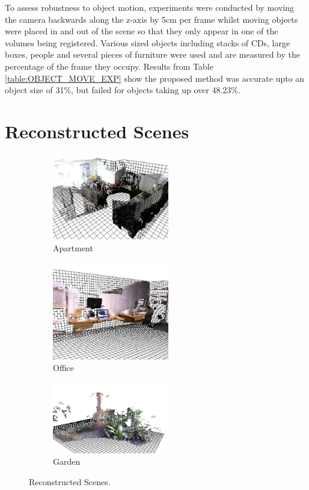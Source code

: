 To assess robustness to object motion, experiments were conducted by moving the camera backwards along the z-axis by 5cm per frame whilst moving objects were placed in and out of the scene so that they only appear in one of the volumes being registered. Various sized objects including stacks of CDs, large boxes, people and several pieces of furniture were used and are measured by the percentage of the frame they occupy. Results from Table \ref{table:OBJECT_MOVE_EXP} show the proposed method was accurate upto an object size of 31\%, but failed for objects taking up over 48.23\%.

\section{Reconstructed Scenes}
\label{Sec:FVRQual1Exp}

\begin{figure}[t] 
        \centering
        \begin{subfigure}[b]{2.0in}
                \includegraphics[width=2.0in]{images/ch2/unit21}
                \caption{Apartment}
                \label{fig:RECON_UNIT}
        \end{subfigure}%
        \begin{subfigure}[b]{2.0in}
                \includegraphics[width=2.0in]{images/ch2/officeA}
                \caption{Office}
                \label{fig:RECON_OFFICE}
        \end{subfigure}%
        \begin{subfigure}[b]{2.0in}
                \includegraphics[width=2.0in]{images/ch2/outdoorA}
                \caption{Garden}
                \label{fig:RECON_GARDEN}
        \end{subfigure}
       \caption{Reconstructed Scenes.}
       \label{fig:RECONSTRUCTIONS}
\end{figure}

